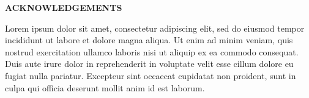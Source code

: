 \clearpage
\begin{centering}
\textbf{ACKNOWLEDGEMENTS}\\
\vspace{\baselineskip}
\end{centering}

Lorem ipsum dolor sit amet, consectetur adipiscing elit, sed do eiusmod tempor incididunt ut labore et dolore magna aliqua. Ut enim ad minim veniam, quis nostrud exercitation ullamco laboris nisi ut aliquip ex ea commodo consequat. Duis aute irure dolor in reprehenderit in voluptate velit esse cillum dolore eu fugiat nulla pariatur. Excepteur sint occaecat cupidatat non proident, sunt in culpa qui officia deserunt mollit anim id est laborum.

\clearpage
